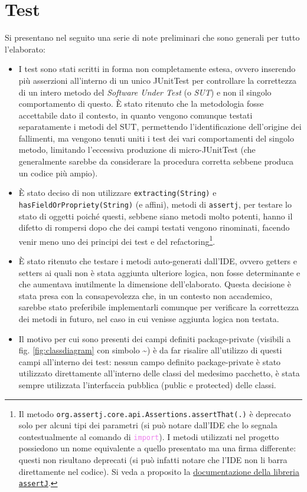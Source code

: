 \documentclass[a4paper,11pt]{article}
\begin{document}
	\section{Test}
	Si presentano nel seguito una serie di note preliminari che sono generali per tutto l'elaborato:
	\begin{itemize}\setlength\itemsep{-3pt}
		\item I test sono stati scritti in forma non completamente estesa, ovvero inserendo più asserzioni all'interno di un unico JUnitTest per controllare la correttezza di un intero metodo del \textit{Software Under Test} (o \textit{SUT}) e non il singolo comportamento di questo. È stato ritenuto che la metodologia fosse accettabile dato il contesto, in quanto vengono comunque testati separatamente i metodi del SUT, permettendo l'identificazione dell'origine dei fallimenti, ma vengono tenuti uniti i test dei vari comportamenti del singolo metodo, limitando l'eccessiva produzione di micro-JUnitTest (che generalmente sarebbe da considerare la procedura corretta sebbene produca un codice più ampio).
		\item È stato deciso di non utilizzare \texttt{extracting(String)} e \texttt{hasFieldOrPropriety(String)} (e affini), metodi di \texttt{assertj}, per testare lo stato di oggetti poiché questi, sebbene siano metodi molto potenti, hanno il difetto di rompersi dopo che dei campi testati vengono rinominati, facendo venir meno uno dei principi dei test e del refactoring\footnote{Il metodo \texttt{org.assertj.core.api.Assertions.assertThat(.)} è deprecato solo per alcuni tipi dei parametri (si può notare dall'IDE che lo segnala contestualmente al comando di \textcolor{violet}{\texttt{import}}). I metodi utilizzati nel progetto possiedono un nome equivalente a quello presentato ma una firma differente: questi non risultano deprecati (si può infatti notare che l'IDE non li barra direttamente nel codice). Si veda a proposito la \href{https://www.javadoc.io/doc/org.assertj/assertj-core/3.26.0/org/assertj/core/api/Assertions.html}{documentazione della libreria \texttt{assertJ}}.}.
		\item È stato ritenuto che testare i metodi auto-generati dall'IDE, ovvero getters e setters ai quali non è stata aggiunta ulteriore logica, non fosse determinante e che aumentava inutilmente la dimensione dell'elaborato. Questa decisione è stata presa con la consapevolezza che, in un contesto non accademico, sarebbe stato preferibile implementarli comunque per verificare la correttezza dei metodi in futuro, nel caso in cui venisse aggiunta logica non testata.
		\item Il motivo per cui sono presenti dei campi definiti package-private (visibili a fig. \ref{fig:classdiagram} con simbolo \textbf{\textasciitilde}) è da far risalire all'utilizzo di questi campi all'interno dei test: nessun campo definito package-private è stato utilizzato direttamente all'interno delle classi del medesimo pacchetto, è stata sempre utilizzata l'interfaccia pubblica (public e protected) delle classi. 
	\end{itemize}
	
\end{document}
